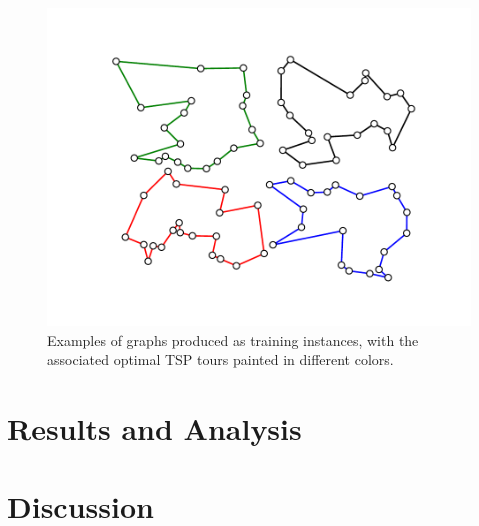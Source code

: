 \documentclass{article}
\begin{document}
\begin{figure}[H]
  \centering
  \includegraphics[width=\linewidth]{training-inst-examples.pdf}
  \caption{Examples of graphs produced as training instances, with the associated optimal TSP tours painted in different colors.}
  \label{fig:training-inst-examples}
\end{figure}

\section{Results and Analysis}

\section{Discussion}



\end{document}
